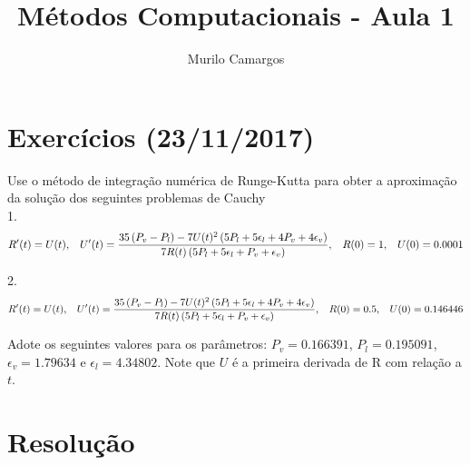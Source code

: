 \documentclass[10pt,a4paper]{article}
\author{Murilo Camargos}
\title{Métodos Computacionais - Aula 1}
\begin{document}


	\section{Exercícios (23/11/2017)}
	Use o método de integração numérica de Runge-Kutta para obter a aproximação da solução dos seguintes problemas de Cauchy\\
	
	1. \[R'(t)=U(t), \hspace{0.3cm} U'(t)=\frac{35\left(P_v-P_l\right) - 7U(t)^2\left(5P_l+5\epsilon_l+4P_v+4\epsilon_v\right)}{7R(t)\left(5P_l+5\epsilon_l+P_v+\epsilon_v\right)}, \hspace{0.3cm} R(0)=1, \hspace{0.3cm} U(0)=0.0001\]
	
	2. \[R'(t)=U(t), \hspace{0.3cm} U'(t)=\frac{35\left(P_v-P_l\right) - 7U(t)^2\left(5P_l+5\epsilon_l+4P_v+4\epsilon_v\right)}{7R(t)\left(5P_l+5\epsilon_l+P_v+\epsilon_v\right)}, \hspace{0.3cm} R(0)=0.5, \hspace{0.3cm} U(0)=0.146446\]
	
	Adote os seguintes valores para os parâmetros: $P_v=0.166391$, $P_l=0.195091$, $\epsilon_v=1.79634$ e $\epsilon_l=4.34802$. Note que $U$ é a primeira derivada de R com relação a $t$.
	
	\section{Resolução}
	
\end{document}
